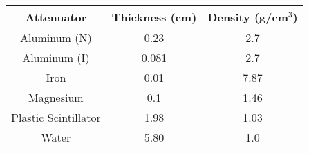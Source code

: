 \begin{tabular}{ccc}
	\toprule
	Attenuator           & Thickness (cm) & Density (g/cm$^3$) \\
	\midrule
	Aluminum (N)         & 0.23           & 2.7                               \\
	Aluminum (I)         & 0.081          & 2.7                               \\
	Iron                 & 0.01           & 7.87                              \\
	Magnesium            & 0.1            & 1.46                              \\
	Plastic Scintillator & 1.98           & 1.03                              \\
	Water                & 5.80           & 1.0           			\\
	\bottomrule
\end{tabular}
